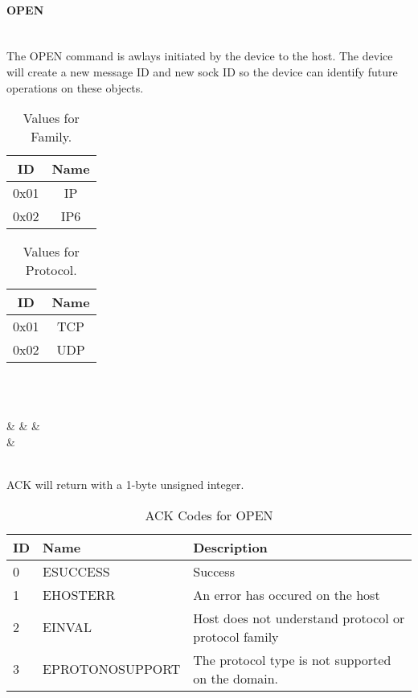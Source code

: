 \documentclass[10pt]{article}
\begin{document}
	\paragraph{OPEN} \mbox{}\\
	The OPEN command is awlays initiated by the device to the host. The device will create a new message ID and new sock ID so the device can identify future operations on these objects.\\
	\begin{table}[H]
		\begin{center}
			\caption{Values for Family.}
			\label{tab:table2}
			\begin{tabular}{c|c} 
				\rowcolor{lightgray}
				\textbf{ID} &	\textbf{Name}\\
				\hline
				0x01 & IP\\
				0x02 & IP6\\
			\end{tabular}
		\end{center}
	\end{table} 
	\begin{table}[H]
	\begin{center}
		\caption{Values for Protocol.}
		\label{tab:table3}
		\begin{tabular}{c|c} 
			\rowcolor{lightgray}
			\textbf{ID} &	\textbf{Name}\\
			\hline
			0x01 & TCP\\
			0x02 & UDP\\
		\end{tabular}
	\end{center}
	\end{table} \mbox{}
	\\
	\begin{bytefield}[bitwidth=1.7em]{32}
		 \\
			 &
			 &
			 &
			 \\
			 &
			 \\
	\end{bytefield}\\
	ACK will return with a 1-byte unsigned integer. 
	\begin{table}[H]
		\begin{center}
			\caption{ACK Codes for OPEN}
			\label{tab:openErrTable}
			\begin{tabular}{l|l|l} 
				\rowcolor{lightgray}
				\textbf{ID} &	\textbf{Name} & \textbf{Description}\\
				\hline
				0 & ESUCCESS & Success\\
				1 & EHOSTERR & An error has occured on the host\\
				2 & EINVAL & Host does not understand protocol or protocol family\\
				3 & EPROTONOSUPPORT & The protocol type is not supported on the domain. \\
			\end{tabular}
		\end{center}
	\end{table} \mbox{}\\
\end{document}
